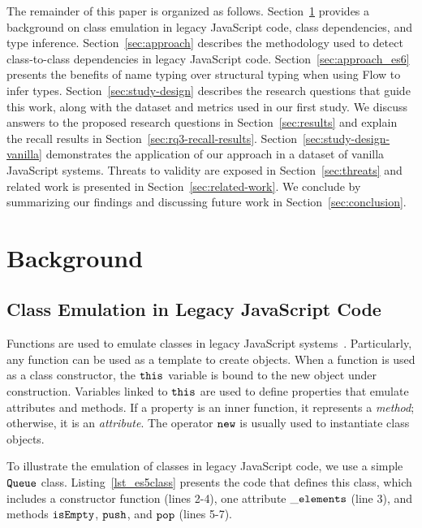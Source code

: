 \documentclass[review]{elsarticle}
\newcommand{\mcode}[1]{$\tt #1$}
\begin{document}
The remainder of this paper is organized as follows. Section~\ref{sec:background} provides a background on class emulation in legacy JavaScript code, class dependencies, and type inference. Section~\ref{sec:approach} describes the methodology used to detect class-to-class dependencies in legacy JavaScript code. Section~\ref{sec:approach_es6} presents the benefits of name typing over structural typing when using Flow to infer types. Section~\ref{sec:study-design} describes the research questions that guide this work, along with the dataset and metrics used in our first study. We discuss answers to the proposed research questions in Section~\ref{sec:results} and explain the recall results in Section~\ref{sec:rq3-recall-results}. Section~\ref{sec:study-design-vanilla} demonstrates the application of our approach in a dataset of vanilla JavaScript systems. Threats to validity are exposed in Section~\ref{sec:threats} and related work is presented in Section~\ref{sec:related-work}. We conclude by summarizing our findings and discussing future work in Section~\ref{sec:conclusion}.


\section{Background}
\label{sec:background}

\subsection{Class Emulation in Legacy JavaScript Code}
\label{sec:class-emulation}

Functions are used to emulate classes in legacy JavaScript systems~\cite{leonardo-jsep2017, rostami2016}. Particularly, any function can be used as a template to create objects. When a function is used as a class constructor, the \mcode{this} variable is bound to the new object under construction. Variables linked to \mcode{this} are used to define properties that emulate attributes and methods. If a property is an inner function, it represents a {\em method}; otherwise, it is an {\em attribute}. The operator \mcode{new} is usually used to instantiate class objects. 

To illustrate the emulation of classes in legacy JavaScript code, we use a simple \mcode{Queue} class. Listing~\ref{lst_es5class} presents the code that defines this class, which includes a constructor function (lines 2-4), one attribute \mcode{\_elements} (line 3), and methods \mcode{isEmpty}, \mcode{push}, and \mcode{pop} (lines 5-7). 
\end{document}
